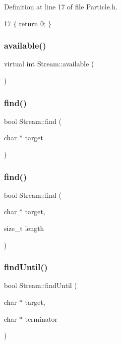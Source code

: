 Definition at line 17 of file Particle.\+h.


\begin{DoxyCode}
17 \{ \textcolor{keywordflow}{return} 0; \}
\end{DoxyCode}
\mbox{\label{class_stream_a9c98a763395005c08ce95afb2f06c7b1}} 
\subsubsection{available()\hspace{0.1cm}{\footnotesize\ttfamily [2/2]}}
{\footnotesize\ttfamily virtual int Stream\+::available (\begin{DoxyParamCaption}{ }\end{DoxyParamCaption})\hspace{0.3cm}{\ttfamily [pure virtual]}}

\mbox{\label{class_stream_a4bab30ccd324efd461dee46a2339f673}} 
\subsubsection{find()\hspace{0.1cm}{\footnotesize\ttfamily [1/2]}}
{\footnotesize\ttfamily bool Stream\+::find (\begin{DoxyParamCaption}\item[{char $\ast$}]{target }\end{DoxyParamCaption})}

\mbox{\label{class_stream_ad851401f2318cdb1de05707e021b81d9}} 
\subsubsection{find()\hspace{0.1cm}{\footnotesize\ttfamily [2/2]}}
{\footnotesize\ttfamily bool Stream\+::find (\begin{DoxyParamCaption}\item[{char $\ast$}]{target,  }\item[{size\+\_\+t}]{length }\end{DoxyParamCaption})}

\mbox{\label{class_stream_ad1f5f6600832396fb38a897baf4de35b}} 
\subsubsection{find\+Until()\hspace{0.1cm}{\footnotesize\ttfamily [1/2]}}
{\footnotesize\ttfamily bool Stream\+::find\+Until (\begin{DoxyParamCaption}\item[{char $\ast$}]{target,  }\item[{char $\ast$}]{terminator }\end{DoxyParamCaption})}

